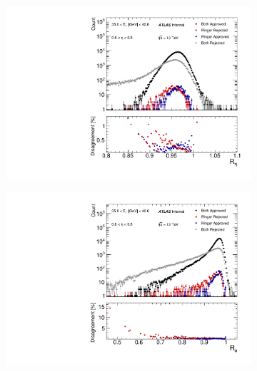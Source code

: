 \begin{figure}[h!]
\centering
\begin{subfigure}[c]{.49\textwidth}
\centering
\includegraphics[width=\textwidth]{sections/analyses/figures/quadrant_plots/HLT_e28_lhtight_nod0_noringer_ivarloose_HLT_e28_lhtight_nod0_ivarloose_reta_et4_eta1.pdf}
\caption{}
\label{fig:quadrant_calo_variables_30GeV_eta}
\end{subfigure}
\begin{subfigure}[c]{.49\textwidth}
\centering
\includegraphics[width=\textwidth]{sections/analyses/figures/quadrant_plots/HLT_e28_lhtight_nod0_noringer_ivarloose_HLT_e28_lhtight_nod0_ivarloose_rphi_et4_eta1.pdf}
\caption{}
\end{subfigure} 

\end{figure}
